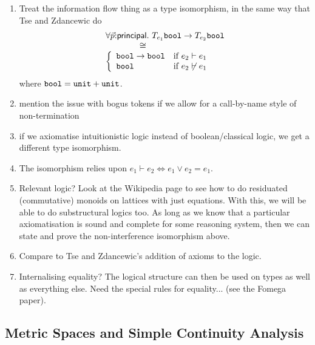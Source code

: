 \begin{enumerate}
\item Treat the information flow thing as a type isomorphism, in the
  same way that Tse and Zdancewic do
  \begin{displaymath}
    \begin{array}{l}
    \forall \vec{p}\mathord:\mathsf{principal}.\ T_{e_1}\texttt{bool} \to T_{e_2}\texttt{bool}\\
    \hspace{4em}\cong \\
    \left\{
      \begin{array}{ll}
        \texttt{bool} \to \texttt{bool} & \textrm{if }e_2 \vdash e_1 \\
        \texttt{bool} & \textrm{if }e_2 \not\vdash e_1
      \end{array}
    \right.
  \end{array}
  \end{displaymath}
  where $\texttt{bool} = \texttt{unit} + \texttt{unit}$.
\item mention the issue with bogus tokens if we allow for a
  call-by-name style of non-termination
\item if we axiomatise intuitionistic logic instead of
  boolean/classical logic, we get a different type isomorphism.
\item The isomorphism relies upon $e_1 \vdash e_2 \Leftrightarrow e_1
  \lor e_2 = e_1$.
\item Relevant logic? Look at the Wikipedia page to see how to do
  residuated (commutative) monoids on lattices with just
  equations. With this, we will be able to do substructural logics
  too. As long as we know that a particular axiomatisation is sound
  and complete for some reasoning system, then we can state and prove
  the non-interference isomorphism above.
\item Compare to Tse and Zdancewic's addition of axioms to the logic.
\item Internalising equality? The logical structure can then be used
  on types as well as everything else. Need the special rules for
  equality... (see the Fomega paper).
\end{enumerate}


\subsection{Metric Spaces and Simple Continuity Analysis}
\label{sec:continuity-analysis}

